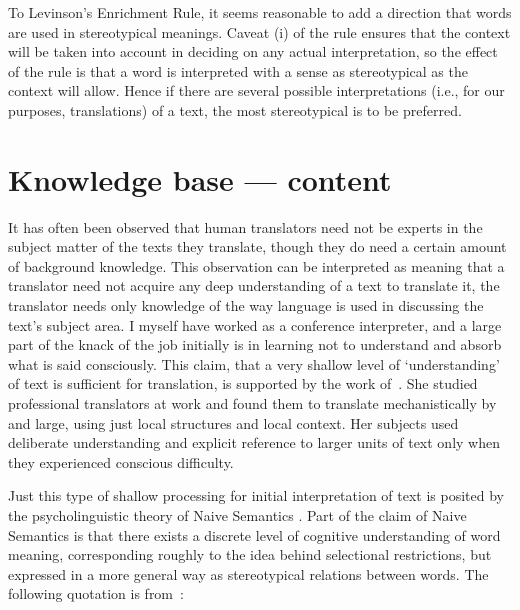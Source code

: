 To Levinson's Enrichment Rule, it seems reasonable to add a direction
that words are used in stereotypical meanings. Caveat (i) of the rule
ensures that the context will be taken into account in deciding on any
actual interpretation, so the effect of the rule is that a word is
interpreted with a sense as stereotypical as the context will allow.
Hence if there are several possible interpretations (i.e., for our purposes,
translations) of a text, the most stereotypical is to be preferred.


\section{Knowledge base --- content}

It has often been observed that human translators need not be experts in
the subject matter of the texts they translate, though they do need a
certain amount of background knowledge.
This observation can be interpreted as meaning that a translator need
not acquire any deep understanding of a text to translate it, the
translator needs only knowledge of the way language is used in
discussing the text's subject area.
I myself have worked as a conference interpreter, and a large part of
the knack of the job initially is in learning not to understand and
absorb what is said consciously.
This claim, that a very shallow level of `understanding' of text is
sufficient for translation, is supported by the work of~\cite{gerloff:89:a}.
She studied professional translators at work and found them to translate
mechanistically by and large, using just local structures and local
context.
Her subjects used deliberate understanding and explicit reference to
larger units of text only when they experienced conscious difficulty.

Just this type of shallow processing for initial interpretation of text
is posited by the psycholinguistic theory of Naive Semantics
\cite{dahlgren:89:a,dahlgren:88:a}.
Part of the claim of Naive Semantics is that there exists
a discrete level of cognitive understanding of word meaning, corresponding
roughly to the idea behind selectional restrictions, but expressed in a
more general way as stereotypical relations between words. The following
quotation is from~\cite{dahlgren:89:a}:

